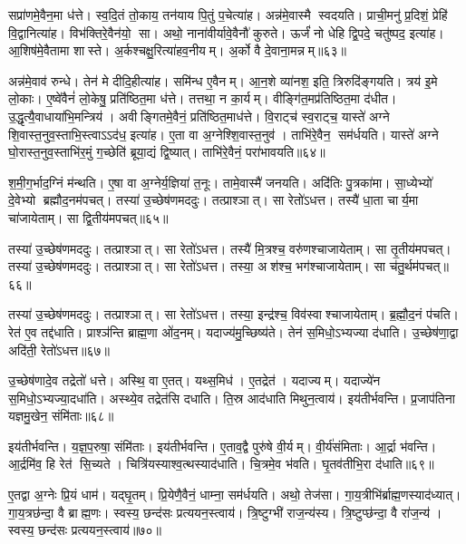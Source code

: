 सप्रा॑णमे॒वैन॒मा ध॑त्ते। स्व॒दि॒तं तो॒काय॒ तन॑याय पि॒तुं प॒चेत्या॑ह। अन्न॑मे॒वास्मै स्वदयति। प्राची॒मनु॑ प्र॒दिशं॒ प्रेहि॑ वि॒द्वानित्या॑ह। विभ॑क्तिरे॒वैन॑यो॒ सा। अथो॒ नाना॑वीर्यावे॒वैनौ॑ कुरुते। ऊर्जं॑ नो धेहि द्वि॒पदे॒ चतु॑ष्पद॒ इत्या॑ह। आ॒शिष॑मे॒वैतामा शास्ते। अ॒र्कश्चक्षु॒रित्या॑हव॒नीयम्। अ॒र्को वै दे॒वाना॒मन्नम्॥६३॥

अन्न॑मे॒वाव॑ रुन्धे। तेन॑ मे दीदि॒हीत्या॑ह। समि॑न्ध ए॒वैनम्। आ॒न॒शे व्या॑नश॒ इति॒ त्रिरुदि॑ङ्गयति। त्रय॑ इ॒मे लो॒काः। ए॒ष्वे॑वैनं॑ लो॒केषु॒ प्रति॑ष्ठित॒मा ध॑त्ते। तत्तथा॒ न का॒र्यम्। वीङ्गि॑त॒मप्र॑तिष्ठित॒मा द॑धीत। उ॒द्धृत्यै॒वाधाया॑भि॒मन्त्रिय॑। अवीङ्गितमे॒वैनं॒ प्रति॑ष्ठित॒माध॑त्ते। वि॒राट्च॑ स्व॒राट्च॒ यास्ते॑ अग्ने शि॒वास्त॒नुव॒स्ताभि॒स्त्वाऽऽद॑ध॒ इत्या॑ह। ए॒ता वा अ॒ग्नेश्शि॒वास्त॒नुव॑। ताभि॑रे॒वैन॒ सम॑र्धयति। यास्ते॑ अग्ने घो॒रास्त॒नुव॒स्ताभि॑र॒मुं ग॒च्छेति॑ ब्रूया॒द्यं द्वि॒ष्यात्। ताभि॑रे॒वैनं॒ परा॑भावयति॥६४॥\anuvakamend[लो॒को॑ऽसृजतैन॒माध॑त्तेऽन्वाहार्य॒पच॑नं दे॒वाना॒मन्न॑मेनं॒ प्रति॑ष्ठित॒माध॑त्ते॒ पञ्च॑ च]

श॒मी॒ग॒र्भाद॒ग्निं म॑न्थति। ए॒षा वा अ॒ग्नेर्य॒ज्ञिया॑ त॒नूः। तामे॒वास्मै॑ जनयति। अदि॑तिः पु॒त्रका॑मा। सा॒ध्येभ्यो॑ दे॒वेभ्यो ब्रह्मौद॒नम॑पचत्। तस्या॑ उ॒च्छेष॑णमददुः। तत्प्राश्ञात्। सा रेतो॑ऽधत्त। तस्यै॑ धा॒ता चार्य॒मा चा॑जायेताम्। सा द्वि॒तीय॑मपचत्॥६५॥

तस्या॑ उ॒च्छेष॑णमददुः। तत्प्राश्ञात्। सा रेतो॑ऽधत्त। तस्यै॑ मि॒त्रश्च॒ वरु॑णश्चाजायेताम्। सा तृ॒तीय॑मपचत्। तस्या॑ उ॒च्छेष॑णमददुः। तत्प्राश्ञात्। सा रेतो॑ऽधत्त। तस्या॒ अश॑श्च॒ भग॑श्चाजायेताम्। सा च॑तु॒र्थम॑पचत्॥६६॥

तस्या॑ उ॒च्छेष॑णमददुः। तत्प्राश्ञात्। सा रेतो॑ऽधत्त। तस्या॒ इन्द्र॑श्च॒ विव॑स्वाश्चाजायेताम्। ब्र॒ह्मौ॒द॒नं प॑चति। रेत॑ ए॒व तद्द॑धाति। प्राश्ञ॑न्ति ब्राह्म॒णा ओ॑द॒नम्। यदाज्य॑मु॒च्छिष्य॑ते। तेन॑ स॒मिधो॒ऽभ्यज्या द॑धाति। उ॒च्छेष॑णा॒द्वा अदि॑ती॒ रेतो॑ऽधत्त॥६७॥

उ॒च्छेष॑णादे॒व तद्रेतो॑ धत्ते। अस्थि॒ वा ए॒तत्। यथ्स॒मिध॑। ए॒तद्रेत॑। यदाज्यम्। यदाज्ये॑न स॒मिधो॒ऽभ्यज्या॒दधा॑ति। अस्थ्ये॒व तद्रेत॑सि दधाति। ति॒स्र आद॑धाति मिथुन॒त्वाय॑। इय॑तीर्भवन्ति। प्र॒जाप॑तिना यज्ञमु॒खेन॒ संमि॑ताः॥६८॥

इय॑तीर्भवन्ति। य॒ज्ञ॒प॒रुषा॒ संमि॑ताः। इय॑तीर्भवन्ति। ए॒ताव॒द्वै पुरु॑षे वी॒र्यम्। वी॒र्य॑संमिताः। आ॒र्द्रा भ॑वन्ति। आ॒र्द्रमि॑व॒ हि रेत॑ सि॒च्यते। चित्रि॑यस्याश्व॒त्थस्याद॑धाति। चि॒त्रमे॒व भ॑वति। घृ॒तव॑तीभि॒रा द॑धाति॥६९॥

ए॒तद्वा अ॒ग्नेः प्रि॒यं धाम॑। यद्घृ॒तम्। प्रि॒येणै॒वैनं॒ धाम्ना॒ सम॑र्धयति। अथो॒ तेज॑सा। गा॒य॒त्रीभि॑र्ब्राह्म॒णस्याद॑ध्यात्। गा॒य॒त्रछ॑न्दा॒ वै ब्राह्म॒णः। स्वस्य॒ छन्द॑सः प्रत्ययन॒स्त्वाय॑। त्रि॒ष्टुग्भी॑ राज॒न्य॑स्य। त्रि॒ष्टुप्छ॑न्दा॒ वै रा॑ज॒न्य॑। स्वस्य॒ छन्द॑सः प्रत्ययन॒स्त्वाय॑॥७०॥

